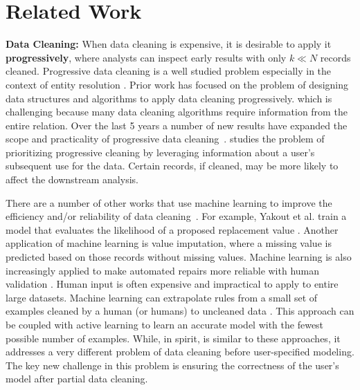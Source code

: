 \vspace{-1em}
\section{Related Work}\label{rw}
\noindent \textbf{Data Cleaning: } 
When data cleaning is expensive, it is desirable to apply it \textbf{progressively}, where analysts can inspect early results with only $k \ll N$ records cleaned.
Progressive data cleaning is a well studied problem especially in the context of entity resolution \cite{altowim2014progressive, whang2014incremental, papenbrock2015progressive, gruenheid2014incremental}.
Prior work has focused on the problem of designing data structures and algorithms to apply data cleaning progressively. which is challenging because many data cleaning algorithms require information from the entire relation.
Over the last 5 years a number of new results have expanded the scope and practicality of progressive data cleaning~\cite{mayfield2010eracer, DBLP:journals/pvldb/YakoutENOI11, yakout2013don}.
\sys studies the problem of prioritizing progressive cleaning by leveraging information about a user's subsequent use for the data.
Certain records, if cleaned, may be more likely to affect the downstream analysis.

There are a number of other works that use machine learning to improve the efficiency and/or reliability of data cleaning~\cite{DBLP:journals/pvldb/YakoutENOI11,yakout2013don,gokhale2014corleone}.
For example, Yakout et al. train a model that evaluates the likelihood of a proposed replacement value \cite{yakout2013don}.
Another application of machine learning is value imputation, where a missing value is predicted based on those records without missing values.
Machine learning is also increasingly applied to make automated repairs more reliable with human validation \cite{DBLP:journals/pvldb/YakoutENOI11}.
Human input is often expensive and impractical to apply to entire large datasets.
Machine learning can extrapolate rules from a small set of examples cleaned by a human (or humans) to uncleaned data \cite{gokhale2014corleone, DBLP:journals/pvldb/YakoutENOI11}.
This approach can be coupled with active learning \cite{DBLP:journals/pvldb/MozafariSFJM14} to learn an accurate model with the fewest possible number of examples.
While, in spirit, \sys is similar to these approaches, it addresses a very different problem of data cleaning before user-specified modeling.
The key new challenge in this problem is ensuring the correctness of the user's model after partial data cleaning.

